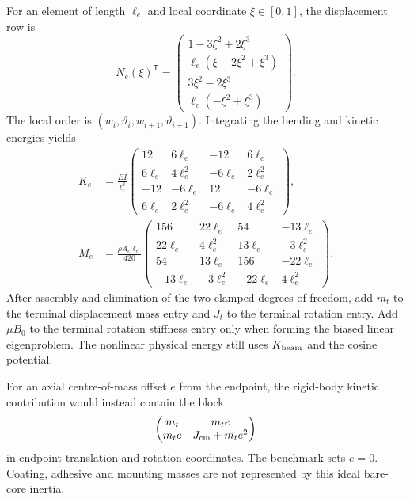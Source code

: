 For an element of length $\ell_e$ and local coordinate
$\xi\in[0,1]$, the displacement row is
\begin{equation}
 N_e(\xi)^{\mathsf T}=
 \begin{pmatrix}
 1-3\xi^2+2\xi^3\\
 \ell_e(\xi-2\xi^2+\xi^3)\\
 3\xi^2-2\xi^3\\
 \ell_e(-\xi^2+\xi^3)
 \end{pmatrix}.
 \label{sm:hermite-shape}
\end{equation}
The local order is $(w_i,\vartheta_i,w_{i+1},\vartheta_{i+1})$.
Integrating the bending and kinetic energies yields
\begin{align}
 K_e&=\frac{EI}{\ell_e^3}
 \begin{pmatrix}
 12&6\ell_e&-12&6\ell_e\\
 6\ell_e&4\ell_e^2&-6\ell_e&2\ell_e^2\\
 -12&-6\ell_e&12&-6\ell_e\\
 6\ell_e&2\ell_e^2&-6\ell_e&4\ell_e^2
 \end{pmatrix},\nonumber\\
 M_e&=\frac{\rho A_c\ell_e}{420}
 \begin{pmatrix}
 156&22\ell_e&54&-13\ell_e\\
 22\ell_e&4\ell_e^2&13\ell_e&-3\ell_e^2\\
 54&13\ell_e&156&-22\ell_e\\
 -13\ell_e&-3\ell_e^2&-22\ell_e&4\ell_e^2
 \end{pmatrix}.
 \label{sm:element-matrices}
\end{align}
After assembly and elimination of the two clamped degrees of freedom,
add $m_t$ to the terminal displacement mass entry and $J_t$ to the
terminal rotation entry. Add $\mu B_0$ to the terminal rotation
stiffness entry only when forming the biased linear eigenproblem.
The nonlinear physical energy still uses $K_{\rm beam}$ and the cosine
potential.

For an axial centre-of-mass offset $e$ from the endpoint, the rigid-body
kinetic contribution would instead contain the block
\begin{equation}
 \begin{pmatrix}m_t&m_te\\m_te&J_{\rm cm}+m_te^2\end{pmatrix}
 \label{sm:offset-tip}
\end{equation}
in endpoint translation and rotation coordinates. The benchmark sets
$e=0$. Coating, adhesive and mounting masses are not represented by
this ideal bare-core inertia.

